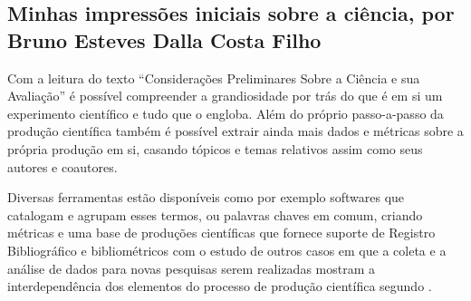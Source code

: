 \subsection{Minhas impressões iniciais sobre a ciência, por Bruno Esteves Dalla Costa Filho}

Com a leitura do texto “Considerações Preliminares Sobre a Ciência e sua Avaliação” é possível compreender a grandiosidade por trás do que é em si um experimento científico e tudo que o engloba. Além do próprio passo-a-passo da produção científica também é possível extrair ainda mais \gls{dados} e métricas sobre a própria produção em si, casando tópicos e temas relativos assim como seus autores e coautores. 

Diversas ferramentas estão disponíveis como por exemplo softwares que catalogam e agrupam esses termos, ou palavras chaves em comum, criando métricas e uma base de produções científicas que fornece suporte de \gls{Registro Bibliográfico} e bibliométricos com o estudo de outros casos em que a coleta e a análise de dados para novas pesquisas serem realizadas mostram a interdependência dos elementos do processo de produção científica segundo \citet{moreira_o_2002}.